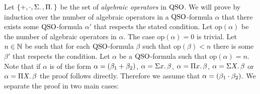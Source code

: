 Let $\{+, \cdot, \Sigma{}.\,, \Pi{}.\,\}$ be the set of {\it algebraic operators} in ${\rm QSO}$. We will prove by induction over the number of algebraic operators in a ${\rm QSO}$-formula $\alpha$ that there exists some ${\rm QSO}$-formula $\alpha'$ that respects the stated condition. Let $\text{op}(\alpha)$ be the number of algebraic operators in $\alpha$. The case $\text{op}(\alpha) = 0$ is trivial. Let $n\in\mathbb{N}$ be such that for each ${\rm QSO}$-formula $\beta$ such that $\text{op}(\beta) < n$ there is some $\beta'$ that respects the condition. Let $\alpha$ be a ${\rm QSO}$-formula such that $\text{op}(\alpha) = n$. Note that if $\alpha$ is of the form $\alpha = (\beta_1 + \beta_2)$, $\alpha = \Sigma{x}.\, \beta$, $\alpha = \Pi{x}.\, \beta$, $\alpha = \Sigma{X}.\, \beta$ or $\alpha = \Pi{X}.\, \beta$ the proof follows directly. Therefore we assume that $\alpha = (\beta_1 \cdot \beta_2)$. We separate the proof in two main cases:
